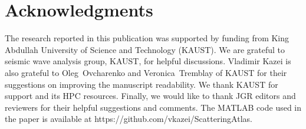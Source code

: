 \section{Acknowledgments}
The research reported in this publication was supported by funding from King Abdullah University of Science and Technology (KAUST). We are grateful to seismic wave analysis group, KAUST, for helpful discussions. Vladimir Kazei is also grateful to Oleg~Ovcharenko and Veronica~Tremblay of KAUST for their suggestions on improving the manuscript readability. We thank KAUST for support and its HPC resources. Finally, we would like to thank JGR editors and reviewers for their helpful suggestions and comments.
The MATLAB code used in the paper is available at https://github.com/vkazei/ScatteringAtlas.

